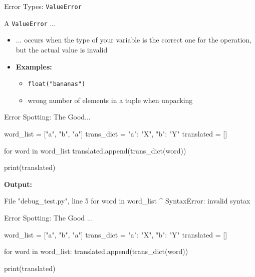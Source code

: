\begin{frame}{Error Types: \texttt{ValueError}}

    A \texttt{ValueError} ...
    \begin{itemize}
        \item ... occurs when the type of your variable is the correct one for the operation, but the actual value is invalid
        \item \textbf{Examples:}
        \begin{itemize}
            \item \texttt{float("bananas")}
            \item wrong number of elements in a tuple when unpacking
        \end{itemize}
    \end{itemize}


\end{frame}

\begin{frame}[fragile]{Error Spotting: The Good...}

    \begin{pythoncode}
    word_list   = ["a", "b", "a"]
    trans_dict  = {"a": "X", "b": "Y"}
    translated  = []

    for word in word_list
        translated.append(trans_dict(word))

    print(translated)
    \end{pythoncode}

    \pause
    \textbf{Output:}

    \begin{outputcode}
      File "debug_test.py", line 5
        for word in word_list
                            ^
    SyntaxError: invalid syntax
    \end{outputcode}

\end{frame}

\begin{frame}[fragile]{Error Spotting: The Good ...}

    \begin{pythoncode}
    word_list   = ["a", "b", "a"]
    trans_dict  = {"a": "X", "b": "Y"}
    translated  = []

    for word in word_list:
        translated.append(trans_dict(word))

    print(translated)
    \end{pythoncode}


\end{frame}

